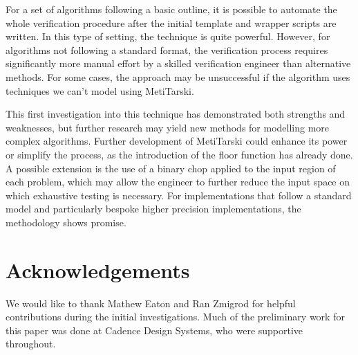 \documentclass{fac}
\begin{document}
For a set of algorithms following a basic outline, it is possible to automate the whole verification procedure after the initial template and wrapper scripts are written. In this type of setting, the technique is quite powerful. However, for algorithms not following a standard format, the verification process requires significantly more manual effort by a skilled verification engineer than alternative methods. For some cases, the approach may be unsuccessful if the algorithm uses techniques we can't model using MetiTarski. 

This first investigation into this technique has demonstrated both strengths and weaknesses, but further research may yield new methods for modelling more complex algorithms. Further development of MetiTarski could enhance its power or simplify the process, as the introduction of the floor function has already done. A possible extension is the use of a binary chop applied to the input region of each problem, which may allow the engineer to further reduce the input space on which exhaustive testing is necessary. For implementations that follow a standard model and particularly bespoke higher precision implementations, the methodology shows promise.


\section*{Acknowledgements}
We would like to thank Mathew Eaton and Ran Zmigrod for helpful contributions during the initial investigations. Much of the preliminary work for this paper was done at Cadence Design Systems, who were supportive throughout. 


   
  

\appendix
\end{document}
